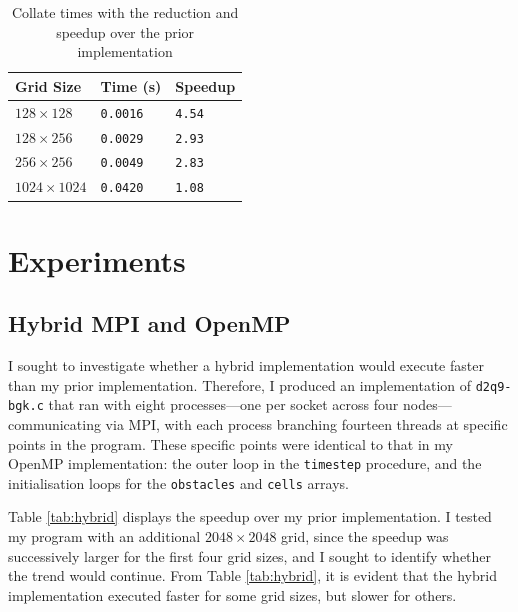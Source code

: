 \documentclass[twocolumn, a4paper]{article}
\begin{document}
\begin{table}[htbp]
  \begin{center}
  \caption{Collate times with the reduction and speedup over the prior implementation}\label{tab:reduction}
  \begin{tabular}[t]{l | l l} 
      \hline\hline
      Grid Size&Time (s)&Speedup\\
      \hline
      $128 \times 128$&\texttt{0.0016}&\texttt{4.54}\\
      $128 \times 256$&\texttt{0.0029}&\texttt{2.93}\\
      $256 \times 256$&\texttt{0.0049}&\texttt{2.83}\\
      $1024 \times 1024$&\texttt{0.0420}&\texttt{1.08}\\
      \hline
    \end{tabular}
  \end{center}
\end{table}

\section{Experiments}

\subsection{Hybrid MPI and OpenMP}

I sought to investigate whether a hybrid implementation would execute faster than my prior implementation.
Therefore, I produced an implementation of \texttt{d2q9-bgk.c} that ran with eight processes---one per socket across four nodes---communicating via MPI, with each process branching fourteen threads at specific points in the program.
These specific points were identical to that in my OpenMP implementation: the outer loop in the \texttt{timestep} procedure, and the initialisation loops for the \texttt{obstacles} and \texttt{cells} arrays.

Table \ref{tab:hybrid} displays the speedup over my prior implementation.
I tested my program with an additional $2048 \times 2048$ grid, since the speedup was successively larger for the first four grid sizes, and I sought to identify whether the trend would continue.
From Table \ref{tab:hybrid}, it is evident that the hybrid implementation executed faster for some grid sizes, but slower for others.
\end{document}
